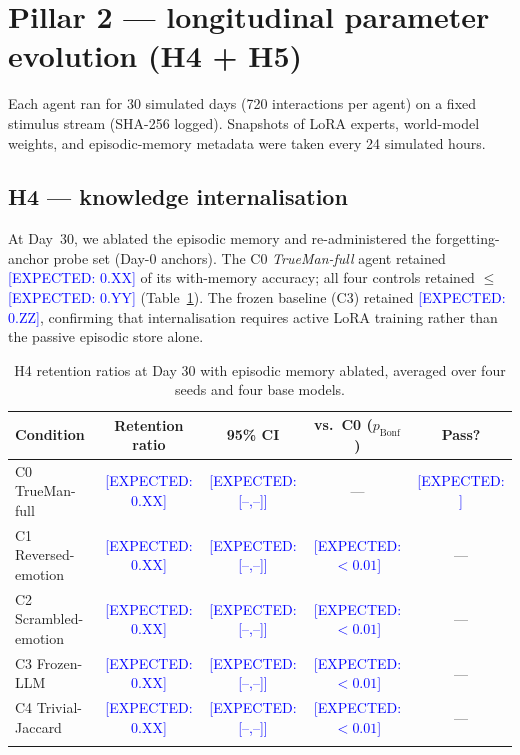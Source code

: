 \documentclass[pdflatex,sn-mathphys-num]{sn-jnl}
\newcommand{\EXPECT}[1]{\textcolor{blue}{[EXPECTED: #1]}}
\theoremstyle{thmstyleone}
\theoremstyle{thmstylethree}
\begin{document}
\section{Pillar 2 --- longitudinal parameter evolution (H4 + H5)}\label{sec:results_h45}

Each agent ran for 30 simulated days (720 interactions per agent) on a fixed stimulus stream (SHA-256 logged). Snapshots of LoRA experts, world-model weights, and episodic-memory metadata were taken every 24 simulated hours.

\subsection{H4 --- knowledge internalisation}

At Day~30, we ablated the episodic memory and re-administered the forgetting-anchor probe set (Day-0 anchors). The C0 \emph{TrueMan-full} agent retained \EXPECT{$0.\text{XX}$} of its with-memory accuracy; all four controls retained $\leq$ \EXPECT{0.YY} (Table~\ref{tab:h4}). The frozen baseline (C3) retained \EXPECT{$0.\text{ZZ}$}, confirming that internalisation requires active LoRA training rather than the passive episodic store alone.

\begin{table}[h]
\caption{H4 retention ratios at Day 30 with episodic memory ablated, averaged over four seeds and four base models.}\label{tab:h4}
\small
\begin{tabular}{@{}lcccc@{}}
\toprule
Condition & Retention ratio & 95\% CI & vs.\ C0 ($p_{\text{Bonf}}$) & Pass? \\
\midrule
C0 TrueMan-full       & \EXPECT{0.XX} & \EXPECT{[--,--]} & ---                & \EXPECT{\checkmark} \\
C1 Reversed-emotion   & \EXPECT{0.XX} & \EXPECT{[--,--]} & \EXPECT{$<0.01$}   & --- \\
C2 Scrambled-emotion  & \EXPECT{0.XX} & \EXPECT{[--,--]} & \EXPECT{$<0.01$}   & --- \\
C3 Frozen-LLM         & \EXPECT{0.XX} & \EXPECT{[--,--]} & \EXPECT{$<0.01$}   & --- \\
C4 Trivial-Jaccard    & \EXPECT{0.XX} & \EXPECT{[--,--]} & \EXPECT{$<0.01$}   & --- \\
\botrule
\end{tabular}
\end{table}
\end{document}
